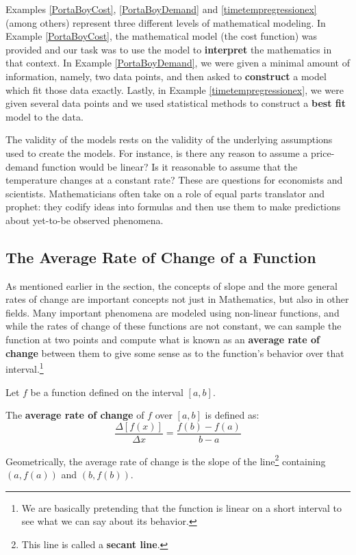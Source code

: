 \documentclass{ximera}
\begin{document}
Examples \ref{PortaBoyCost}, \ref{PortaBoyDemand} and \ref{timetempregressionex} (among others)  represent three different levels of mathematical modeling.  In Example  \ref{PortaBoyCost},  the mathematical model (the cost function) was provided and our task was to use the model to \textbf{interpret} the mathematics in that context.    In Example  \ref{PortaBoyDemand}, we were given a minimal amount of information, namely, two data points, and then asked to \textbf{construct} a model which fit those data exactly.  Lastly, in Example \ref{timetempregressionex}, we were given several data points and we used statistical methods to construct a \textbf{best fit} model to the data. 



The validity of the models rests on the validity of the underlying assumptions used to create the models.  For instance, is there any reason to assume a price-demand function would be linear?  Is it reasonable to assume that the temperature changes at a constant rate? These are questions for economists and scientists.  Mathematicians often take on a role of equal parts translator and prophet:  they codify ideas into formulas and then use them to make predictions about yet-to-be observed phenomena.  


\subsection{The Average Rate of Change of a Function}
\label{AverageRateofChange}

As mentioned earlier in the section, the concepts of slope and the more general rates of change are important concepts not just in Mathematics, but also in other fields.   Many important phenomena are modeled using non-linear functions, and while the rates of change of these functions are not constant, we can sample the function at two points and compute what is known as an \textbf{average rate of change} between them to give some sense as to the function's behavior over that interval.\footnote{We are basically pretending that the function is linear on a short interval to see what we can say about its behavior.}





\begin{definition} \label{arc}  Let $f$ be a function defined on the interval $[a,b]$. 

 The \textbf{average rate of change}  of $f$ over $[a,b]$ is defined as: \[ \frac{\Delta [f(x)]}{\Delta x} = \frac{f(b) - f(a)}{b-a} \]

Geometrically, the average rate of change is the slope of the line\footnote{This line is called a \textbf{secant line}.}  containing $(a, f(a))$ and $(b, f(b))$.

\end{definition}
\end{document}
